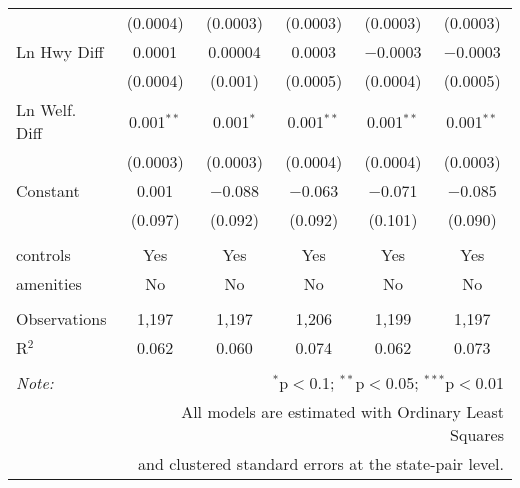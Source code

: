 \begin{table}[!htbp]
\begin{tabular}{@{\extracolsep{5pt}}lccccc}
  & (0.0004) & (0.0003) & (0.0003) & (0.0003) & (0.0003) \\ 
  Ln Hwy Diff & 0.0001 & 0.00004 & 0.0003 & $-$0.0003 & $-$0.0003 \\ 
  & (0.0004) & (0.001) & (0.0005) & (0.0004) & (0.0005) \\ 
  Ln Welf. Diff & 0.001$^{**}$ & 0.001$^{*}$ & 0.001$^{**}$ & 0.001$^{**}$ & 0.001$^{**}$ \\ 
  & (0.0003) & (0.0003) & (0.0004) & (0.0004) & (0.0003) \\ 
  Constant & 0.001 & $-$0.088 & $-$0.063 & $-$0.071 & $-$0.085 \\ 
  & (0.097) & (0.092) & (0.092) & (0.101) & (0.090) \\ 
 \hline \\[-1.8ex] 
controls & Yes & Yes & Yes & Yes & Yes \\ 
amenities & No & No & No & No & No \\ 
\hline \\[-1.8ex] 
Observations & 1,197 & 1,197 & 1,206 & 1,199 & 1,197 \\ 
R$^{2}$ & 0.062 & 0.060 & 0.074 & 0.062 & 0.073 \\ 
\hline 
\hline \\[-1.8ex] 
\textit{Note:}  & \multicolumn{5}{r}{$^{*}$p$<$0.1; $^{**}$p$<$0.05; $^{***}$p$<$0.01} \\ 
 & \multicolumn{5}{r}{All models are estimated with Ordinary Least Squares} \\ 
 & \multicolumn{5}{r}{and clustered standard errors at the state-pair level.} \\ 
\end{tabular} 
\end{table} 
